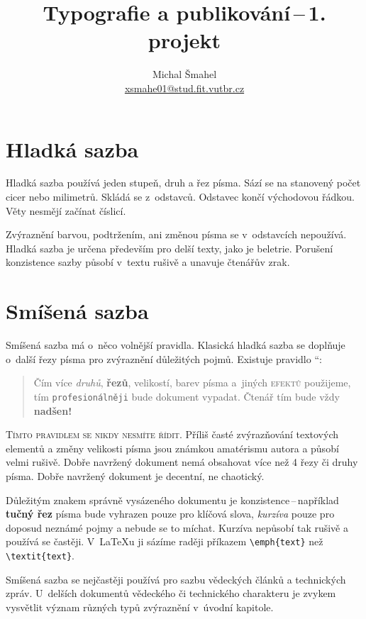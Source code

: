 \documentclass[a4paper, 10pt, twocolumn, final]{article}
\title{Typografie a publikování\,--\,1. projekt}
\author{Michal Šmahel \\ \href{mailto:xsmahe01@stud.fit.vutbr.cz}{xsmahe01@stud.fit.vutbr.cz}}
\date{}
\providecommand{\uv}[1]{\quotedblbase #1 \textquotedblleft}
\begin{document}
\maketitle

\section{Hladká sazba}

Hladká sazba používá jeden stupeň, druh a řez písma.
Sází se na stanovený počet cicer nebo milimetrů.
Skládá se z~odstavců. Odstavec končí východovou řádkou.
Věty nesmějí začínat číslicí.

Zvýraznění barvou, podtržením, ani změnou písma se v~odstavcích nepoužívá.
Hladká sazba je určena především pro delší texty, jako je beletrie.
Porušení konzistence sazby působí v~textu rušivě a unavuje čtenářův zrak.


\section{Smíšená sazba}

Smíšená sazba má o~něco volnější pravidla.
Klasická hladká sazba se doplňuje o~další řezy písma pro zvýraznění důležitých pojmů.
Existuje \uv{pravidlo}:

\begin{quotation}
    Čím více \emph{druhů}, \textbf{řezů}, {\tiny velikostí}, {\color{red} barev} písma a~jiných \textsc{efektů} použijeme, tím \texttt{profesionálněji} bude {\selectfont \Large dokument} vypadat.
    {\huge Č}{\LARGE t}{\Large e}{\large n}{\normalsize á}{\small ř} {\footnotesize t}{\scriptsize í}{\tiny m} bude vždy {\Huge \textbf{nadšen!}}
\end{quotation}

\textsc{Tímto pravidlem se nikdy nesmíte řídit.}
Příliš časté zvýrazňování textových elementů a změny velikosti písma jsou známkou amatérismu autora a působí velmi rušivě.
Dobře navržený dokument nemá obsahovat více než 4 řezy či druhy písma.
Dobře navržený dokument je decentní, ne chaotický.

Důležitým znakem správně vysázeného dokumentu je konzistence\,--\,například \textbf{tučný řez} písma bude vyhrazen pouze pro klíčová slova, \emph{kurzíva} pouze pro doposud neznámé pojmy a nebude se to míchat.
Kurzíva nepůsobí tak rušivě a používá se častěji.
V~\LaTeX{}u ji sázíme raději příkazem \verb|\emph{text}| než \verb|\textit{text}|.

Smíšená sazba se nejčastěji používá pro sazbu vědeckých článků a technických zpráv.
U~delších dokumentů vědeckého či technického charakteru je zvykem vysvětlit význam různých typů zvýraznění v~úvodní kapitole.
\end{document}
